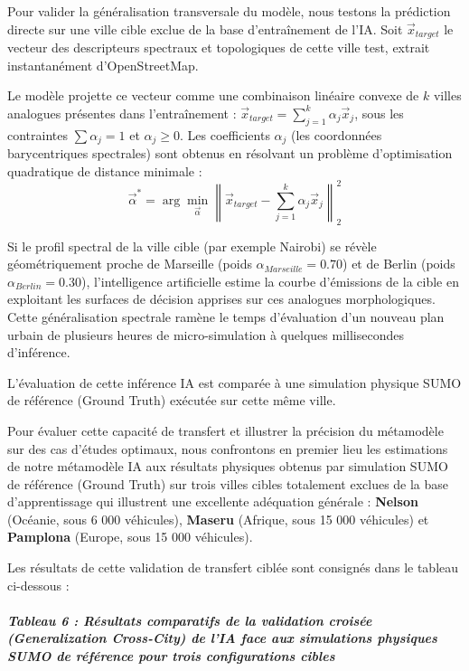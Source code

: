 \documentclass[10pt, a4paper]{article}
\begin{document}
Pour valider la généralisation transversale du modèle, nous testons la
prédiction directe sur une ville cible exclue de la base d'entraînement
de l'IA. Soit \(\vec{x}_{target}\) le vecteur des descripteurs spectraux
et topologiques de cette ville test, extrait instantanément
d'OpenStreetMap.

Le modèle projette ce vecteur comme une combinaison linéaire convexe de
\(k\) villes analogues présentes dans l'entraînement :
\(\vec{x}_{target} = \sum_{j=1}^k \alpha_j \vec{x}_j\), sous les
contraintes \(\sum \alpha_j = 1\) et \(\alpha_j \ge 0\). Les
coefficients \(\alpha_j\) (les coordonnées barycentriques spectrales)
sont obtenus en résolvant un problème d'optimisation quadratique de
distance minimale :
\[\vec{\alpha}^* = \arg\min_{\vec{\alpha}} \left\| \vec{x}_{target} - \sum_{j=1}^k \alpha_j \vec{x}_j \right\|_2^2\]

Si le profil spectral de la ville cible (par exemple Nairobi) se révèle
géométriquement proche de Marseille (poids
\(\alpha_{Marseille} = 0.70\)) et de Berlin (poids
\(\alpha_{Berlin} = 0.30\)), l'intelligence artificielle estime la
courbe d'émissions de la cible en exploitant les surfaces de décision
apprises sur ces analogues morphologiques. Cette généralisation
spectrale ramène le temps d'évaluation d'un nouveau plan urbain de
plusieurs heures de micro-simulation à quelques millisecondes
d'inférence.

L'évaluation de cette inférence IA est comparée à une simulation
physique SUMO de référence (Ground Truth) exécutée sur cette même ville.

Pour évaluer cette capacité de transfert et illustrer la précision du
métamodèle sur des cas d'études optimaux, nous confrontons en premier
lieu les estimations de notre métamodèle IA aux résultats physiques
obtenus par simulation SUMO de référence (Ground Truth) sur trois villes
cibles totalement exclues de la base d'apprentissage qui illustrent une
excellente adéquation générale : \textbf{Nelson} (Océanie, sous 6 000
véhicules), \textbf{Maseru} (Afrique, sous 15 000 véhicules) et
\textbf{Pamplona} (Europe, sous 15 000 véhicules).

Les résultats de cette validation de transfert ciblée sont consignés
dans le tableau ci-dessous :

\subparagraph{Tableau 6 : Résultats comparatifs de la validation croisée
(Generalization Cross-City) de l'IA face aux simulations physiques SUMO
de référence pour trois configurations
cibles}\label{tableau-6-ruxe9sultats-comparatifs-de-la-validation-croisuxe9e-generalization-cross-city-de-lia-face-aux-simulations-physiques-sumo-de-ruxe9fuxe9rence-pour-trois-configurations-cibles}
\end{document}
